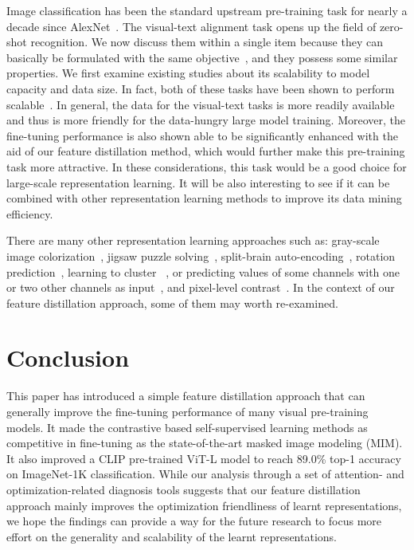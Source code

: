 \documentclass{article}
\begin{document}
\begin{itemize}
   Image classification has been the standard upstream pre-training task for nearly a decade since AlexNet~\cite{alexnet}. The visual-text alignment task opens up the field of zero-shot recognition. We now discuss them within a single item because they can basically be formulated with the same objective~\cite{wei2022icar,yang2022unified}, and they possess some similar properties. We first examine existing studies about its scalability to model capacity and data size. In fact, both of these tasks have been shown to perform scalable~\cite{zhai2021scaling, swinv2, radford2021clip, jia2021align, radford2021clip, jia2021align}. In general, the data for the visual-text tasks is more readily available and thus is more friendly for the data-hungry large model training. Moreover, the fine-tuning performance is also shown able to be significantly enhanced with the aid of our feature distillation method, which would further make this pre-training task more attractive. In these considerations, this task would be a good choice for large-scale representation learning. It will be also interesting to see if it can be combined with other representation learning methods to improve its data mining efficiency. 
\end{itemize}

There are many other representation learning approaches such as: gray-scale image colorization~\cite{zhang2016colorization}, jigsaw puzzle solving~\cite{noroozi2016jigsaw}, split-brain auto-encoding~\cite{zhang2017splitbrain}, rotation prediction~\cite{gidaris2018rotation}, learning to cluster~ \cite{caron2018deepcluster}, or predicting values of some channels with one or two other channels as input~\cite{zhang2016colorization,zhang2017splitbrain}, and pixel-level contrast~\cite{xie2021pixpro,wang2020DenseCL}. In the context of our feature distillation approach, some of them may worth re-examined.

\section{Conclusion}

This paper has introduced a simple feature distillation approach that can generally improve the fine-tuning performance of many visual pre-training models. It made the contrastive based self-supervised learning methods as competitive in fine-tuning as the state-of-the-art masked image modeling (MIM). It also improved a CLIP pre-trained ViT-L model to reach 89.0\% top-1 accuracy on ImageNet-1K classification. While our analysis through a set of attention- and optimization-related diagnosis tools suggests that our feature distillation approach mainly improves the optimization friendliness of learnt representations, we hope the findings can provide a way for the future research to focus more effort on the generality and scalability of the learnt representations.
\end{document}
